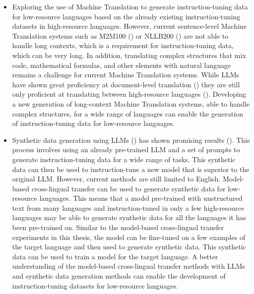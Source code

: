 \begin{itemize}
    \item Exploring the use of Machine Translation to generate instruction-tuning data for low-resource languages based on the already existing instruction-tuning datasets in high-resource languages. However, current sentence-level Machine Translation systems such as M2M100 (\cite{aharoni-etal-2019-massively}) or NLLB200 (\cite{DBLP:journals/corr/abs-2207-04672}) are not able to handle long contexts, which is a requirement for instruction-tuning data, which can be very long. In addition, translating complex structures that mix code, mathematical formulas, and other elements with natural language remains a challenge for current Machine Translation systems. While LLMs have shown great proficiency at document-level translation (\cite{xu2023paradigm,tower_llm_2024}) they are still only proficient at translating between high-resource languages (\cite{DBLP:journals/corr/abs-2311-07978,DBLP:conf/africanlp/OjoO23}). Developing a new generation of long-context Machine Translation systems, able to handle complex structures, for a wide range of languages can enable the generation of instruction-tuning data for low-resource languages.
    \item Synthetic data generation using LLMs (\cite{OpenHermes}) has shown promising results (\cite{zou2023representationengineeringtopdownapproach,DBLP:journals/corr/abs-2404-07503}). This process involves using an already pre-trained LLM and a set of prompts to generate instruction-tuning data for a wide range of tasks. This synthetic data can then be used to instruction-tune a new model that is superior to the original LLM. However, current methods are still limited to English. Model-based cross-lingual transfer can be used to generate synthetic data for low-resource languages. This means that a model pre-trained with unstructured text from many languages and instruction-tuned in only a few high-resource languages may be able to generate synthetic data for all the languages it has been pre-trained on. Similar to the model-based cross-lingual transfer experiments in this thesis, the model can be fine-tuned on a few examples of the target language and then used to generate synthetic data. This synthetic data can be used to train a model for the target language. A better understanding of the model-based cross-lingual transfer methods with LLMs and synthetic data generation methods can enable the development of instruction-tuning datasets for low-resource languages. 

\end{itemize}

